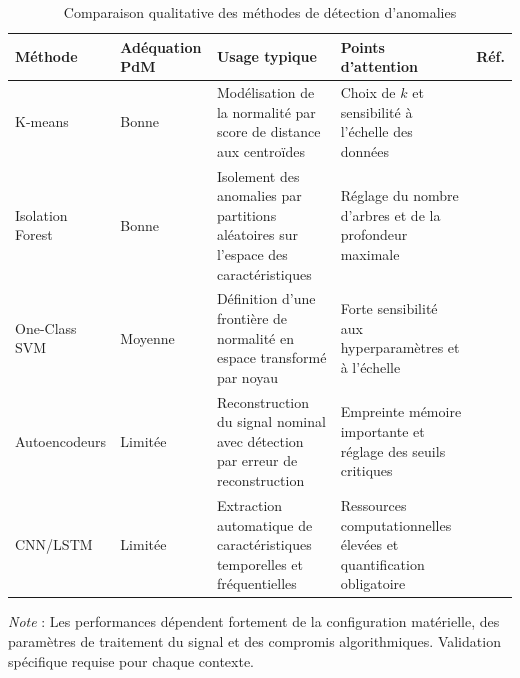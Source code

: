 \begin{table}[ht]
\centering
\small
\begin{tabular}{@{}p{2.5cm}p{2.5cm}p{5cm}p{4cm}p{1.2cm}@{}}
\toprule
\textbf{Méthode} &
\textbf{Adéquation PdM} &
\textbf{Usage typique} &
\textbf{Points d'attention} &
\textbf{Réf.} \\
\midrule

K-means &
Bonne &
Modélisation de la normalité par score de distance aux centroïdes &
Choix de $k$ et sensibilité à l'échelle des données &
\cite{macqueen1967,chandola2009} \\

\midrule

Isolation Forest &
Bonne &
Isolement des anomalies par partitions aléatoires sur l'espace des caractéristiques &
Réglage du nombre d'arbres et de la profondeur maximale &
\cite{chandola2009,antonini2023} \\

\midrule

One-Class SVM &
Moyenne &
Définition d'une frontière de normalité en espace transformé par noyau &
Forte sensibilité aux hyperparamètres et à l'échelle &
\cite{chandola2009} \\

\midrule

Autoencodeurs &
Limitée &
Reconstruction du signal nominal avec détection par erreur de reconstruction &
Empreinte mémoire importante et réglage des seuils critiques &
\cite{chandola2009,ran2019} \\

\midrule

CNN/LSTM &
Limitée &
Extraction automatique de caractéristiques temporelles et fréquentielles &
Ressources computationnelles élevées et quantification obligatoire &
\cite{langer2025,arciniegas2025} \\

\bottomrule
\end{tabular}

\vspace{0.3cm}
\caption{Comparaison qualitative des méthodes de détection d'anomalies}
\label{tab:ml_comparison}

\vspace{0.2cm}
\footnotesize\textit{Note} : Les performances dépendent fortement de la configuration matérielle, des paramètres de traitement du signal et des compromis algorithmiques. Validation spécifique requise pour chaque contexte.
\end{table}


